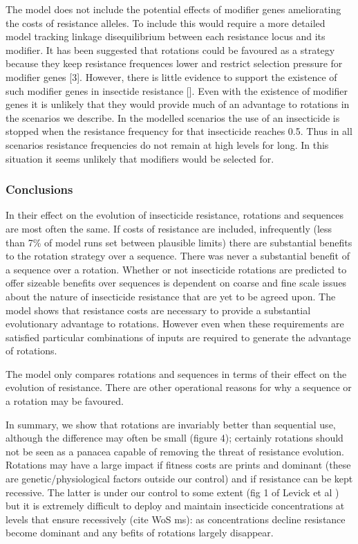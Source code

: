 \documentclass[11pt,]{article}
\begin{document}
The model does not include the potential effects of modifier genes
ameliorating the costs of resistance alleles. To include this would
require a more detailed model tracking linkage disequilibrium between
each resistance locus and its modifier. It has been suggested that
rotations could be favoured as a strategy because they keep resistance
frequences lower and restrict selection pressure for modifier genes
{[}3{]}. However, there is little evidence to support the existence of
such modifier genes in insectide resistance {[}{]}. Even with the
existence of modifier genes it is unlikely that they would provide much
of an advantage to rotations in the scenarios we describe. In the
modelled scenarios the use of an insecticide is stopped when the
resistance frequency for that insecticide reaches 0.5. Thus in all
scenarios resistance frequencies do not remain at high levels for long.
In this situation it seems unlikely that modifiers would be selected
for.

\subsubsection{Conclusions}\label{conclusions}

In their effect on the evolution of insecticide resistance, rotations
and sequences are most often the same. If costs of resistance are
included, infrequently (less than 7\% of model runs set between
plausible limits) there are substantial benefits to the rotation
strategy over a sequence. There was never a substantial benefit of a
sequence over a rotation. Whether or not insecticide rotations are
predicted to offer sizeable benefits over sequences is dependent on
coarse and fine scale issues about the nature of insecticide resistance
that are yet to be agreed upon. The model shows that resistance costs
are necessary to provide a substantial evolutionary advantage to
rotations. However even when these requirements are satisfied particular
combinations of inputs are required to generate the advantage of
rotations.

The model only compares rotations and sequences in terms of their effect
on the evolution of resistance. There are other operational reasons for
why a sequence or a rotation may be favoured.

In summary, we show that rotations are invariably better than sequential
use, although the difference may often be small (figure 4); certainly
rotations should not be seen as a panacea capable of removing the threat
of resistance evolution. Rotations may have a large impact if fitness
costs are prints and dominant (these are genetic/physiological factors
outside our control) and if resistance can be kept recessive. The latter
is under our control to some extent (fig 1 of Levick et al ) but it is
extremely difficult to deploy and maintain insecticide concentrations at
levels that ensure recessively (cite WoS ms): as concentrations decline
resistance become dominant and any befits of rotations largely
disappear.
\end{document}
